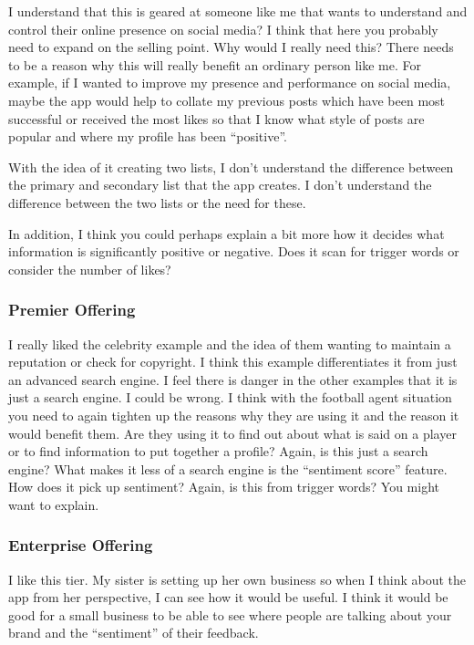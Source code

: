       I understand that this is geared at someone like me that wants to understand and control their online presence on social media? I think that here you probably need to expand on the selling point. Why would I really need this? There needs to be a reason why this will really benefit an ordinary person like me. For example, if I wanted to improve my presence and performance on social media, maybe the app would help to collate my previous posts which have been most successful or received the most likes so that I know what style of posts are popular and where my profile has been ``positive''.

      With the idea of it creating two lists, I don't understand the difference between the primary and secondary list that the app creates. I don't understand the difference between the two lists or the need for these.

      In addition, I think you could perhaps explain a bit more how it decides what information is significantly positive or negative. Does it scan for trigger words or consider the number of likes?

    \subsubsection{Premier Offering}

      I really liked the celebrity example and the idea of them wanting to maintain a reputation or check for copyright. I think this example differentiates it from just an advanced search engine. I feel there is danger in the other examples that it is just a search engine. I could be wrong. I think with the football agent situation you need to again tighten up the reasons why they are using it and the reason it would benefit them. Are they using it to find out about what is said on a player or to find information to put together a profile? Again, is this just a search engine? What makes it less of a search engine is the ``sentiment score'' feature. How does it pick up sentiment? Again, is this from trigger words? You might want to explain.

    \subsubsection{Enterprise Offering}

      I like this tier. My sister is setting up her own business so when I think about the app from her perspective, I can see how it would be useful. I think it would be good for a small business to be able to see where people are talking about your brand and the ``sentiment'' of their feedback.

